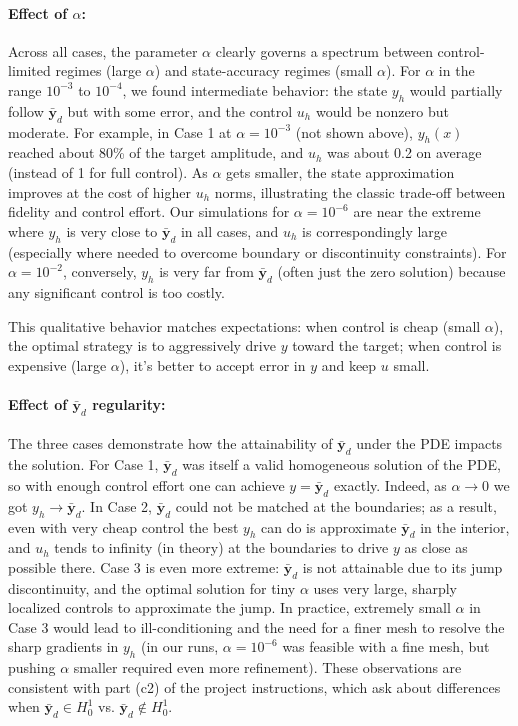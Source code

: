 \paragraph{Effect of $\alpha$:} Across all cases, the parameter $\alpha$ clearly governs a spectrum between control-limited regimes (large $\alpha$) and state-accuracy regimes (small $\alpha$). 
For $\alpha$ in the range $10^{-3}$ to $10^{-4}$, we found intermediate behavior: the state $y_h$ would partially follow $\bar{\mathbf{y}}_d$ but with some error, and the control $u_h$ would be nonzero but moderate. 
For example, in Case 1 at $\alpha=10^{-3}$ (not shown above), $y_h(x)$ reached about 80\% of the target amplitude, and $u_h$ was about 0.2 on average (instead of 1 for full control). As $\alpha$ gets smaller, the state approximation improves at the cost of higher $u_h$ norms, illustrating the classic trade-off between fidelity and control effort. Our simulations for $\alpha=10^{-6}$ are near the extreme where $y_h$ is very close to $\bar{\mathbf{y}}_d$ in all cases, and $u_h$ is correspondingly large (especially where needed to overcome boundary or discontinuity constraints). For $\alpha=10^{-2}$, conversely, $y_h$ is very far from $\bar{\mathbf{y}}_d$ (often just the zero solution) because any significant control is too costly.

This qualitative behavior matches expectations: when control is cheap (small $\alpha$), the optimal strategy is to aggressively drive $y$ toward the target; when control is expensive (large $\alpha$), it's better to accept error in $y$ and keep $u$ small.

\paragraph{Effect of $\bar{\mathbf{y}}_d$ regularity:} The three cases demonstrate how the attainability of $\bar{\mathbf{y}}_d$ under the PDE impacts the solution. For Case 1, $\bar{\mathbf{y}}_d$ was itself a valid homogeneous solution of the PDE, so with enough control effort one can achieve $y=\bar{\mathbf{y}}_d$ exactly. Indeed, as $\alpha\to 0$ we got $y_h\to \bar{\mathbf{y}}_d$. In Case 2, $\bar{\mathbf{y}}_d$ could not be matched at the boundaries; as a result, even with very cheap control the best $y_h$ can do is approximate $\bar{\mathbf{y}}_d$ in the interior, and $u_h$ tends to infinity (in theory) at the boundaries to drive $y$ as close as possible there. Case 3 is even more extreme: $\bar{\mathbf{y}}_d$ is not attainable due to its jump discontinuity, and the optimal solution for tiny $\alpha$ uses very large, sharply localized controls to approximate the jump. In practice, extremely small $\alpha$ in Case 3 would lead to ill-conditioning and the need for a finer mesh to resolve the sharp gradients in $y_h$ (in our runs, $\alpha=10^{-6}$ was feasible with a fine mesh, but pushing $\alpha$ smaller required even more refinement). These observations are consistent with part (c2) of the project instructions, which ask about differences when $\bar{\mathbf{y}}_d \in H^1_0$ vs. $\bar{\mathbf{y}}_d\notin H^1_0$.

